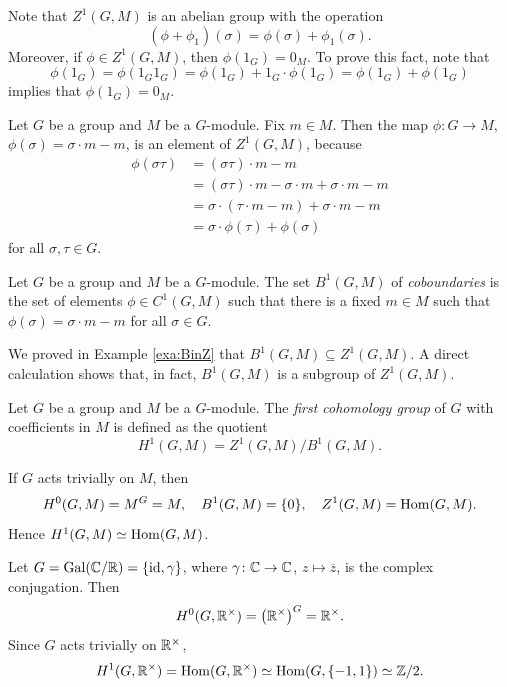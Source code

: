 Note that $Z^1(G,M)$ is an abelian group with the operation
\[
(\phi+\phi_1)(\sigma)=\phi(\sigma)+\phi_1(\sigma).
\]
Moreover, if $\phi\in Z^1(G,M)$, then 
$\phi(1_G)=0_M$. To prove this fact, note that  
\[
\phi(1_G)=\phi(1_G1_G)=\phi(1_G)+1_G\cdot\phi(1_G)=\phi(1_G)+\phi(1_G)
\]
implies
that $\phi(1_G)=0_M$. 

\begin{example}
\label{exa:BinZ}
    Let $G$ be a group and $M$ be a $G$-module. Fix $m\in M$. Then
    the map $\phi\colon G\to M$, $\phi(\sigma)=\sigma\cdot m-m$, is an element 
    of $Z^1(G,M)$, because 
    \begin{align*}
    \phi(\sigma\tau)&=(\sigma\tau)\cdot m-m\\
    &=(\sigma\tau)\cdot m-\sigma\cdot m+\sigma\cdot m-m\\
    &=\sigma\cdot (\tau\cdot m-m)+\sigma\cdot m-m\\
    &=\sigma\cdot \phi(\tau)+\phi(\sigma)   
    \end{align*}
    for all $\sigma,\tau\in G$.
\end{example}

\begin{definition}
    Let $G$ be a group and $M$ be a $G$-module. The set
    $B^1(G,M)$ of \emph{coboundaries} is the set 
    of elements $\phi\in C^1(G,M)$ such that there is a fixed 
    $m\in M$ such that
    $\phi(\sigma)=\sigma\cdot m-m$ for all $\sigma\in G$.
\end{definition}

We proved in Example \ref{exa:BinZ} that  
$B^1(G,M)\subseteq Z^1(G,M)$. A direct calculation shows that, in fact, 
$B^1(G,M)$ is a subgroup of $Z^1(G,M)$. 

\begin{definition}
    Let $G$ be a group and $M$ be a $G$-module. The 
    \emph{first cohomology group} of $G$ with coefficients
    in $M$ is defined as the quotient
    \[
    H^1(G,M)=Z^1(G,M)/B^1(G,M).
    \]
\end{definition}

\begin{example}
    If $G$ acts trivially on $M$, then 
    \[
    H^0(G,M)=M^G=M,
    \quad 
    B^1(G,M)=\{0\},
    \quad 
    Z^1(G,M)=\operatorname{Hom}(G,M).
    \]
    Hence 
    $H^1(G,M)\simeq\operatorname{Hom}(G,M)$.
\end{example}

\begin{example}
    Let $G=\operatorname{Gal}(\mathbb{C}/\mathbb{R})=\{\operatorname{id},\gamma\}$, where $\gamma\colon\mathbb{C}\to\mathbb{C}$, $z\mapsto\overline{z}$, is the complex conjugation. Then
    \[
    H^0(G,\mathbb{R}^\times)=\left(\mathbb{R}^\times\right)^G=\mathbb{R}^\times.
    \]
    Since $G$ acts trivially on $\mathbb{R}^\times$, 
    \[
    H^1(G,\mathbb{R}^\times)=\operatorname{Hom}(G,\mathbb{R}^\times)\simeq\operatorname{Hom}(G,\{-1,1\})\simeq\mathbb{Z}/2.
    \]
\end{example}

